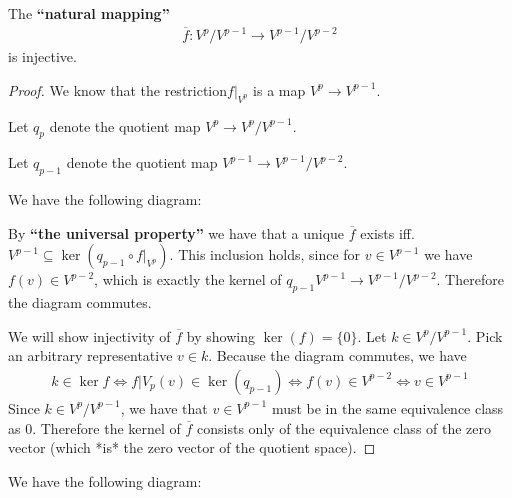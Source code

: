 \documentclass{report}
\newcommand*{\newpar}{\par\vspace{\baselineskip}\noindent}
\begin{document}
\begin{theorem}
The \textbf{``natural mapping''}
\begin{align*}
 \overline{f}: V^p / V^{p-1} \to V^{p-1} / V^{p-2}
\end{align*}
is injective.
\end{theorem}
\begin{proof}
We know that the restriction$f|_{V^p}$ is a map $V^p \to V^{p-1}$.
\newpar
Let $q_p$ denote the quotient map $V^p \to V^p/V^{p-1}$.
\newpar
Let $q_{p-1}$ denote the quotient map $V^{p-1} \to V^{p-1}/V^{p-2}$.
\newpar
We have the following diagram:
\begin{figure}[h!]
\centering
{}
\end{figure}
\newpar
By \textbf{``the universal property''} we have that a unique $\overline{f}$ exists iff. $V^{p-1} \subseteq \ker(q_{p-1} \circ f|_{V^p})$. This inclusion holds, since for $v \in V^{p-1}$ we have $f(v) \in V^{p-2}$, which is exactly the kernel of $q_{p-1} V^{p-1} \to V^{p-1}/V^{p-2}$. Therefore the diagram commutes.
\newpar
We will show injectivity of $\overline{f}$ by showing $\ker(f) = \{0\}$. Let $k \in V^p / V^{p-1}$. Pick an arbitrary representative $v \in k$. Because the diagram commutes, we have
\begin{align*}
 k \in \ker f \Leftrightarrow f | V_p (v) \in \ker(q_{p-1}) \Leftrightarrow f(v) \in V^{p-2} \Leftrightarrow v \in V^{p-1}
\end{align*}
Since $k \in V^p / V^{p-1}$, we have that $v \in V^{p-1}$ must be in the same equivalence class as $0$. Therefore the kernel of $\overline{f}$ consists only of the equivalence class of the zero vector (which *is* the zero vector of the quotient space).
\end{proof}
\newpage
We have the following diagram:
\begin{figure}[h!]
\centering
{}
\end{figure}
\end{document}
